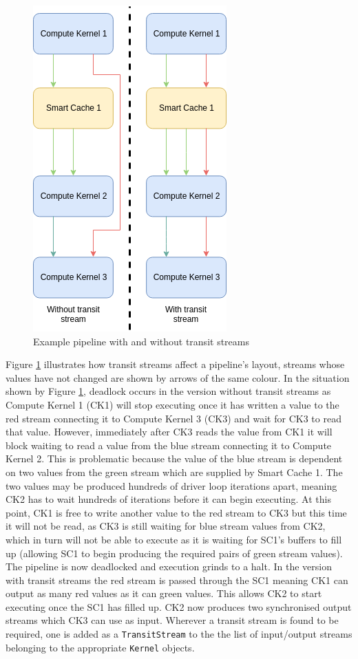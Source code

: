 \documentclass{mpaper}
\begin{document}
\begin{figure}
    \centering
    \includegraphics[scale=0.6]{images/Transit_stream.png}
    \caption{Example pipeline with and without transit streams}
    \label{fig:transit_stream}
\end{figure}

Figure \ref{fig:transit_stream} illustrates how transit streams affect a pipeline's layout, streams whose values have not changed are shown by arrows of the same colour. 
In the situation shown by Figure \ref{fig:transit_stream}, deadlock occurs in the version without transit streams as Compute Kernel 1 (CK1) will stop executing once it has written a value to the red stream connecting it to Compute Kernel 3 (CK3) and wait for CK3 to read that value. 
However, immediately after CK3 reads the value from CK1 it will block waiting to read a value from the blue stream connecting it to Compute Kernel 2.
This is problematic because the value of the blue stream is dependent on two values from the green stream which are supplied by Smart Cache 1.
The two values may be produced hundreds of driver loop iterations apart, meaning CK2 has to wait hundreds of iterations before it can begin executing. 
At this point, CK1 is free to write another value to the red stream to CK3 but this time it will not be read, as CK3 is still waiting for blue stream values from CK2, which in turn will not be able to execute as it is waiting for SC1's buffers to fill up (allowing SC1 to begin producing the required pairs of green stream values).
The pipeline is now deadlocked and execution grinds to a halt.
In the version with transit streams the red stream is passed through the SC1 meaning CK1 can output as many red values as it can green values.
This allows CK2 to start executing once the SC1 has filled up. 
CK2 now produces two synchronised output streams which CK3 can use as input.
Wherever a transit stream is found to be required, one is added as a \texttt{TransitStream} to the the list of input/output streams belonging to the appropriate \texttt{Kernel} objects.    
\end{document}
